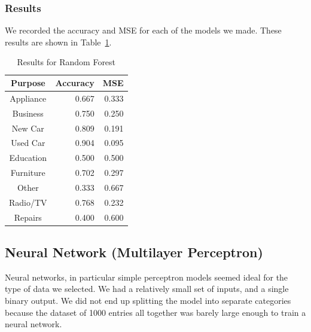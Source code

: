 \documentclass[12pt,twocolumn]{article}
\begin{document}
\subsubsection{Results}

We recorded the accuracy and MSE for each of the models we made. These results are shown in Table~\ref{tab:random_forest_results}.


\begin{table}
    \centering
    \begin{tabular}{|c|r|r|}
        \hline
        Purpose & Accuracy & MSE \\
        \hline
        \hline
        Appliance & 0.667 & 0.333 \\
        \hline
        Business & 0.750 & 0.250 \\
        \hline
        New Car & 0.809 & 0.191 \\
        \hline
        Used Car & 0.904 & 0.095 \\
        \hline
        Education & 0.500 & 0.500 \\
        \hline
        Furniture & 0.702 & 0.297 \\
        \hline
        Other & 0.333 & 0.667 \\
        \hline
        Radio/TV & 0.768 & 0.232 \\
        \hline
        Repairs & 0.400 & 0.600 \\
        \hline
    \end{tabular}
    \caption{Results for Random Forest}\label{tab:random_forest_results}
\end{table}


\subsection{Neural Network (Multilayer Perceptron)}
Neural networks, in particular simple perceptron models seemed ideal for the type of data we selected. We had a relatively small set of inputs, and a single binary output. We did not end up splitting the model into separate categories because the dataset of 1000 entries all together was barely large enough to train a neural network.
\end{document}
